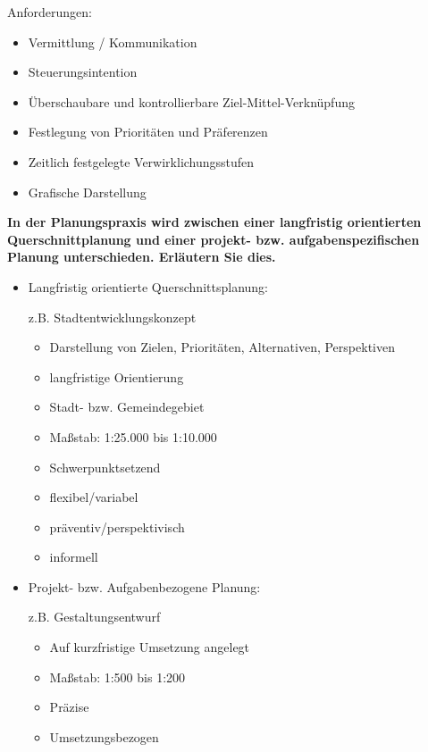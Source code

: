 \documentclass[]{article}
\newenvironment{question}{\vspace{8mm}\noindent\bfseries}{\\}
\begin{document}
Anforderungen:
\begin{itemize}
	\item Vermittlung / Kommunikation
	\item Steuerungsintention
	\item Überschaubare und kontrollierbare Ziel-Mittel-Verknüpfung
	\item Festlegung von Prioritäten und Präferenzen
	\item Zeitlich festgelegte Verwirklichungsstufen
	\item Grafische Darstellung
\end{itemize}


\begin{question}
	In der Planungspraxis wird zwischen einer langfristig orientierten Querschnittplanung und einer projekt- bzw. aufgabenspezifischen Planung unterschieden. Erläutern Sie dies.
\end{question}
\begin{itemize}
	\item Langfristig orientierte Querschnittsplanung:
	
	z.B. Stadtentwicklungskonzept
	
	\begin{itemize}
		\item Darstellung von Zielen, Prioritäten, Alternativen, Perspektiven
		\item langfristige Orientierung
		\item Stadt- bzw. Gemeindegebiet
		\item Maßstab: 1:25.000 bis 1:10.000
		\item Schwerpunktsetzend
		\item flexibel/variabel
		\item präventiv/perspektivisch
		\item informell
	\end{itemize}

	\item Projekt- bzw. Aufgabenbezogene Planung:
	
	z.B. Gestaltungsentwurf
	
	\begin{itemize}
		\item Auf kurzfristige Umsetzung angelegt
		\item Maßstab: 1:500 bis 1:200
		\item Präzise
		\item Umsetzungsbezogen
	\end{itemize}
\end{itemize}
\end{document}
